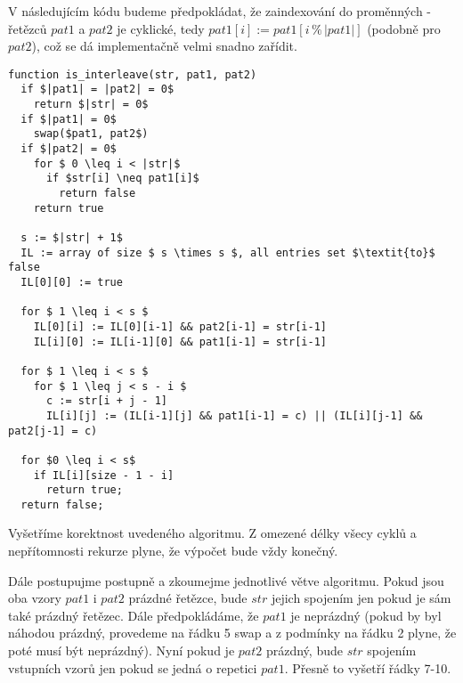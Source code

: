 \documentclass[12pt,a4paper]{article}
\theoremstyle{plain}
\newcommand\addfunctions[1]{%
  \lstset{morekeywords=[4]{#1}}}
\begin{document}
\pagestyle{fancy}                      %
\fancyhf{}                             %
\addtolength{\topmargin}{-30 pt}                   %
\setlength{\headsep}{10 pt}                      %
\renewcommand{\headrulewidth}{1 pt}                %

\addfunctions{is_interleave}

V následujícím kódu budeme předpokládat, že zaindexování do proměnných - řetězců $pat1 $ a $ pat2 $ je cyklické, tedy $ pat1[i] := pat1[i \operatorname{\%} |pat1|] $ (podobně pro $pat2$), což se dá implementačně velmi snadno zařídit.


\begin{lstlisting}[mathescape]
function is_interleave(str, pat1, pat2)
  if $|pat1| = |pat2| = 0$
    return $|str| = 0$
  if $|pat1| = 0$
    swap($pat1, pat2$)
  if $|pat2| = 0$
    for $ 0 \leq i < |str|$
      if $str[i] \neq pat1[i]$
        return false
    return true
    
  s := $|str| + 1$
  IL := array of size $ s \times s $, all entries set $\textit{to}$ false
  IL[0][0] := true
  
  for $ 1 \leq i < s $
    IL[0][i] := IL[0][i-1] && pat2[i-1] = str[i-1]
    IL[i][0] := IL[i-1][0] && pat1[i-1] = str[i-1]
    
  for $ 1 \leq i < s $ 
    for $ 1 \leq j < s - i $ 
      c := str[i + j - 1]
      IL[i][j] := (IL[i-1][j] && pat1[i-1] = c) || (IL[i][j-1] && pat2[j-1] = c)
      
  for $0 \leq i < s$
    if IL[i][size - 1 - i]
      return true;
  return false;
\end{lstlisting}

Vyšetříme korektnost uvedeného algoritmu. Z omezené délky všecy cyklů a nepřítomnosti rekurze plyne, že výpočet bude vždy konečný.

Dále postupujme postupně a zkoumejme jednotlivé větve algoritmu. Pokud jsou oba vzory $ pat1 $ i $ pat2 $ prázdné řetězce, bude $ str $ jejich spojením jen pokud je sám také prázdný řetězec. Dále předpokládáme, že $ pat1 $ je neprázdný (pokud by byl náhodou prázdný, provedeme na řádku 5 swap a z podmínky na řádku 2 plyne, že poté musí být neprázdný). Nyní pokud je $ pat2 $ prázdný, bude $ str $ spojením vstupních vzorů jen pokud se jedná o repetici $ pat1 $. Přesně to vyšetří řádky 7-10. 
\end{document}
